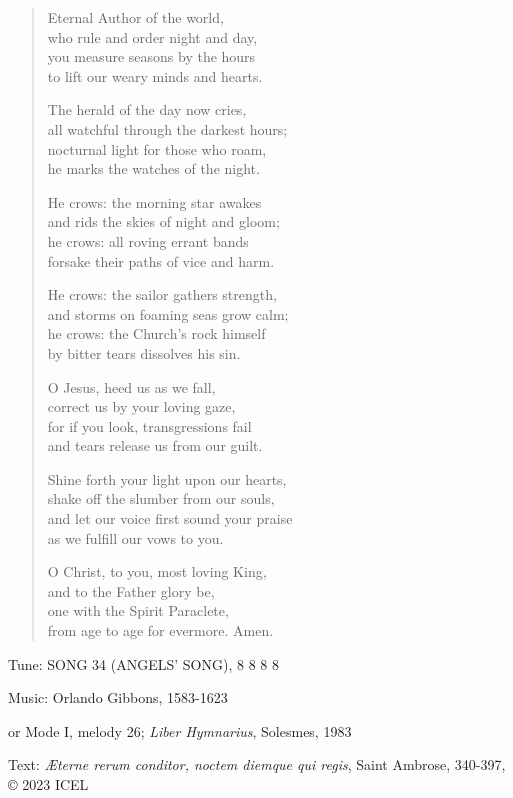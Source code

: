 \hymn

\begin{verse}
Eternal Author of the world,\\
who rule and order night and day,\\
you measure seasons by the hours\\
to lift our weary minds and hearts.

The herald of the day now cries,\\
all watchful through the darkest hours;\\
nocturnal light for those who roam,\\
he marks the watches of the night.

He crows: the morning star awakes\\
and rids the skies of night and gloom;\\
he crows: all roving errant bands\\
forsake their paths of vice and harm.

He crows: the sailor gathers strength,\\
and storms on foaming seas grow calm;\\
he crows: the Church’s rock himself\\
by bitter tears dissolves his sin.

O Jesus, heed us as we fall,\\
correct us by your loving gaze,\\
for if you look, transgressions fail\\
and tears release us from our guilt.

Shine forth your light upon our hearts,\\
shake off the slumber from our souls,\\
and let our voice first sound your praise\\
as we fulfill our vows to you.

O Christ, to you, most loving King,\\
and to the Father glory be,\\
one with the Spirit Paraclete,\\
from age to age for evermore. Amen.
\end{verse}

\begin{hymnsource}
Tune: SONG 34 (ANGELS’ SONG), 8 8 8 8

Music: Orlando Gibbons, 1583-1623

or Mode I, melody 26; \emph{Liber Hymnarius}, Solesmes, 1983

Text: \emph{Æterne rerum conditor, noctem diemque qui regis}, Saint Ambrose, 340-397, © 2023 ICEL
\end{hymnsource}